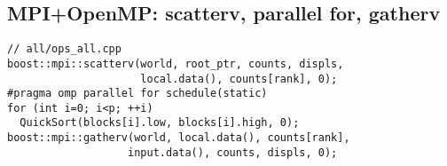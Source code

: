 \documentclass[12pt]{article}
\begin{document}
\subsection*{MPI+OpenMP: scatterv, parallel for, gatherv}
\begin{lstlisting}
// all/ops_all.cpp
boost::mpi::scatterv(world, root_ptr, counts, displs,
                     local.data(), counts[rank], 0);
#pragma omp parallel for schedule(static)
for (int i=0; i<p; ++i)
  QuickSort(blocks[i].low, blocks[i].high, 0);
boost::mpi::gatherv(world, local.data(), counts[rank],
                   input.data(), counts, displs, 0);
\end{lstlisting}
\end{document}

